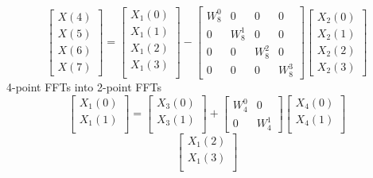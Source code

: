 \documentclass[journal,12pt,twocolumn]{IEEEtran}
\renewcommand\thesection{\arabic{section}}
\begin{document}
\begin{enumerate}[label=\thesection.\arabic*.,ref=\thesection.\theenumi]
\begin{equation}
\label{eq:8-low}
\end{equation}
\begin{equation}
\begin{bmatrix}
X(4) \\ 
X(5) \\ 
X(6) \\ 
X(7)
\end{bmatrix}
=
\begin{bmatrix}
X_{1}(0) \\ 
X_{1}(1)\\ 
X_{1}(2)\\
X_{1}(3)\\
\end{bmatrix}
-
\begin{bmatrix}
W^{0}_{8} & 0 & 0 & 0\\
0 & W^{1}_{8} & 0 & 0\\
0 & 0 & W^{2}_{8} & 0\\
0 & 0 & 0 & W^{3}_{8}
\end{bmatrix}
\begin{bmatrix}
X_{2}(0) \\ 
X_{2}(1) \\ 
X_{2}(2) \\
X_{2}(3)
\end{bmatrix}
\label{eq:8-high}
\end{equation}
4-point FFTs into 2-point FFTs
\begin{equation}
\begin{bmatrix}
X_{1}(0) \\ 
X_{1}(1)\\ 
\end{bmatrix}
=
\begin{bmatrix}
X_{3}(0) \\ 
X_{3}(1)\\ 
\end{bmatrix}
+
\begin{bmatrix}
W^{0}_{4} & 0\\
0 & W^{1}_{4}
\end{bmatrix}
\begin{bmatrix}
X_{4}(0) \\ 
X_{4}(1) \\ 
\end{bmatrix}
\label{eq:4-1-high}
\end{equation}
\begin{equation}
\begin{bmatrix}
X_{1}(2) \\ 
X_{1}(3)\\ 
\end{bmatrix}

\end{equation}
\end{enumerate}
\end{document}
